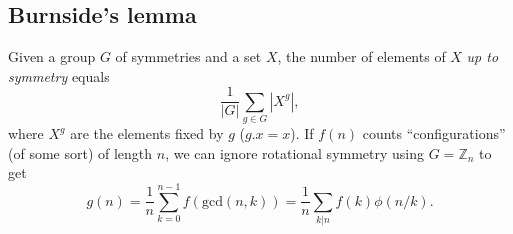   \subsection{Burnside's lemma}
  Given a group $G$ of symmetries and a set $X$, the number of elements of $X$ \emph{up to symmetry} equals
   \[ {\frac {1}{|G|}}\sum _{{g\in G}}|X^{g}|, \]
   where $X^{g}$ are the elements fixed by $g$ ($g.x = x$).  
   If $f(n)$ counts ``configurations'' (of some sort) of length $n$, we can ignore rotational symmetry using $G = \mathbb Z_n$ to get
   \[ g(n) = \frac 1 n \sum_{k=0}^{n-1}{f(\text{gcd}(n, k))} = \frac 1 n \sum_{k|n}{f(k)\phi(n/k)}. \]  
